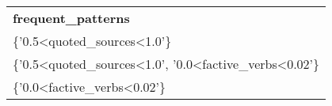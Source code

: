 \begin{tabular}{ll}
\multicolumn{2}{l}{\textbf{frequent\_patterns}}                                                                        \\
\multicolumn{2}{l}{\{'0.5\textless{}quoted\_sources\textless{}1.0'\}}                                                  \\
\multicolumn{2}{l}{\{'0.5\textless{}quoted\_sources\textless{}1.0',   '0.0\textless{}factive\_verbs\textless{}0.02'\}} \\
\multicolumn{2}{l}{\{'0.0\textless{}factive\_verbs\textless{}0.02'\}}                                                 
\end{tabular}